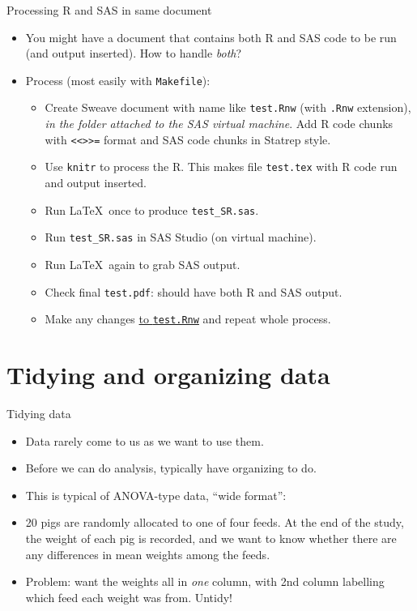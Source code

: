 \documentclass[unknownkeysallowed]{beamer}\usepackage[]{graphicx}\usepackage[]{color}
\begin{document}
\begin{frame}[fragile]{Processing R and SAS in same document}
  
  \begin{itemize}
  \item You might have a document that contains both R and SAS code to
    be run (and output inserted). How to handle \emph{both}?
  \item Process (most easily with \texttt{Makefile}):
    \begin{itemize}
    \item Create Sweave document with name like \texttt{test.Rnw}
      (with \texttt{.Rnw} extension), \emph{in the folder attached to
        the SAS virtual machine}. Add R
      code chunks with \verb+<<>>=+ format and SAS code chunks in
      Statrep style.
      
    \item Use \texttt{knitr} to process the R. This makes file
      \texttt{test.tex} with R code run and output inserted.
    \item Run \LaTeX\ once to produce \texttt{test\_SR.sas}.
    \item Run \texttt{test\_SR.sas} in SAS Studio (on virtual
      machine).
    \item Run \LaTeX\ again to grab SAS output.
    \item Check final \texttt{test.pdf}: should have both R and SAS
      output.
    \item Make any changes \underline{to \texttt{test.Rnw}} and repeat whole process.
    \end{itemize}

  \end{itemize}
  
\end{frame}
 

\section{Tidying and organizing data}

\frame{\sectionpage}

\begin{frame}[fragile]{Tidying data}
\begin{itemize}
\item Data rarely come to us as we want to use them.
\item Before we can do analysis, typically have organizing to do.
\item This is typical of ANOVA-type data, ``wide format'':
  
  
\item 20 pigs are randomly allocated to one of four feeds. At the end
  of the study, the weight of each pig is recorded, and we want to
  know whether there are any differences in mean weights among the
  feeds.
\item Problem: want the weights all in \emph{one} column, with 2nd
  column labelling which feed each weight was from. Untidy!
\end{itemize}
\end{frame}
\end{document}
